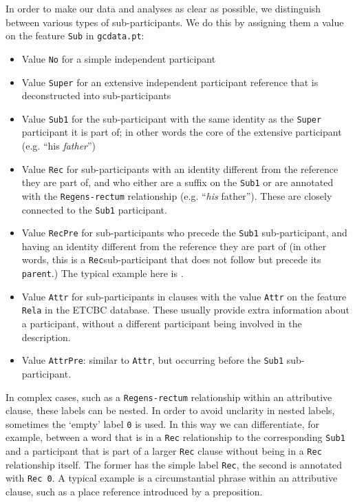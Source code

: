 \documentclass{report}
\newcommand{\mi}[1]{\lstinline{#1}}
\newcommand{\hebr}[1]{\cjRL{#1}}
\begin{document}
In order to make our data and analyses as clear as possible, we distinguish between various types of sub-participants. We do this by assigning them a value on the feature \mi{Sub} in \mi{gcdata.pt}:
\begin{itemize}
\item Value \mi{No} for a simple independent participant
\item Value \mi{Super} for an extensive independent participant reference that is deconstructed into sub-participants
\item Value \mi{Sub1} for the sub-participant with the same identity as the \mi{Super} participant it is part of; in other words the core of the extensive participant (e.g. ``his \emph{father}'')
\item Value \mi{Rec} for sub-participants with an identity different from the reference they are part of, and who either are a suffix on the \mi{Sub1} or are annotated with the \mi{Regens-rectum} relationship (e.g. ``\emph{his} father''). These are closely connected to the \mi{Sub1} participant.
\item Value \mi{RecPre} for sub-participants who precede the \mi{Sub1} sub-participant, and having an identity different from the reference they are part of (in other words, this is a \mi{Rec}sub-participant that does not follow but precede its \mi{parent}.) The typical example here is \hebr{KL}.
\item Value \mi{Attr} for sub-participants in clauses with the value \mi{Attr} on the feature \mi{Rela} in the ETCBC database. These usually provide extra information about a participant, without a different participant being involved in the description.
\item Value \mi{AttrPre}: similar to \mi{Attr}, but occurring before the \mi{Sub1} sub-participant.
\end{itemize}

In complex cases, such as a \mi{Regens-rectum} relationship within an attributive clause, these labels can be nested.
In order to avoid unclarity in nested labels, sometimes the `empty' label \mi{0} is used. In this way we can differentiate, for example, between a word that is in a \mi{Rec} relationship to the corresponding \mi{Sub1} and a participant that is part of a larger \mi{Rec} clause without being in a \mi{Rec} relationship itself. The former has the simple label \mi{Rec}, the second is annotated with \mi{Rec 0}. A typical example is a circumstantial phrase within an attributive clause, such as a place reference introduced by a preposition.
\end{document}
